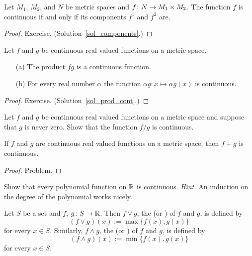 \begin{prop}\label{components} Let $M_1$, $M_2$, and $N$ be metric spaces and $f\colon N \rightarrow M_1
\times M_2$. The function $f$ is continuous if and only if its components $f^1$ and $f^2$ are.
\end{prop}

\begin{proof} Exercise.   (Solution~\ref{sol_components}.) \ns  \end{proof}

\begin{prop}\label{prod_cont} Let $f$ and $g$ be continuous real valued functions on a metric space.
 \begin{enumerate}
  \item[(a)] The product $fg$ is a continuous function.
  \item[(b)] For every real number $\alpha$ the function $\alpha g\colon x \mapsto \alpha g(x)$
is continuous.
 \end{enumerate}
\end{prop}

\begin{proof} Exercise.   (Solution~\ref{sol_prod_cont}.)  \ns  \end{proof}

\begin{prob} Let $f$ and $g$ be continuous real valued functions on a metric space and suppose that
$g$ is never zero.  Show that the function $f/g$ is continuous.
\end{prob}

\begin{prop} If $f$ and $g$ are continuous real valued functions on a metric space, then $f+g$ is
continuous.
\end{prop}

\begin{proof} Problem.  \ns  \end{proof}

\begin{prob} Show that every polynomial function on $\mathbb{R}$ is continuous.  \emph{Hint.} An induction
on the degree of the polynomial works nicely.
\end{prob}

\begin{defn} Let $S$ be a set and $f$, $g\colon S \rightarrow \mathbb{R}$.  Then $f \lor g$, the
 (or
) of $f$ and $g$, is defined by
  \[(f \lor g)(x) := \max\{f(x),g(x)\}\]
for every $x \in S$.  Similarly, $f \land g$, the
 (or
) of $f$ and $g$, is defined by
  \[ (f \land g)(x) := \min\{f(x),g(x)\} \]
for every $x \in S$.
\end{defn}

